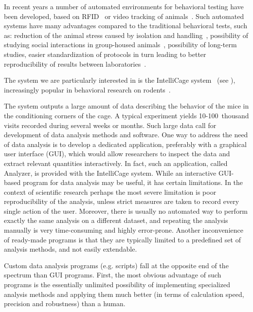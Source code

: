 
In recent years a number of automated environments for behavioral testing
have been developed, based on 
RFID~\cite{Dellomo:1998ts,Galsworthy:2005br,Daan:2011wl,EcoHABfullyauto:2015tk}
or video tracking of
animals~\cite{deChaumont:2012du,Weissbrod:2013bc,Shemesh:2013be,PerezEscudero:2014ed}.
Such automated systems have many advantages compared to the traditional behavioral tests,
such as:
reduction of the animal stress caused by isolation and
handling~\cite{Heinrichs:2006dk,Sorge:2014fb},
possibility of studying social interactions in group-housed
animals~\cite{Kiryk:2011tk},
possibility of long-term studies,
easier standardization of protocols in turn leading to better
reproducibility of results between
laboratories~\cite{Crabbe:1999vf,Chesler:2002wo,Krackow:2010ck,Codita:2012jv,Morrison:2014cn,Vannoni:2014jt}.

The system we are particularly interested in is the IntelliCage
system~\cite{intelliCagePlusManual2011,Kiryk:2011tk,Radwanska:2012fd,Puscian:2014cu,Mijakowska:2015io}
(see ), increasingly popular in behavioral research on
rodents~\cite{IntelliCageReferenceList}.

The system outputs a large amount of data
describing the behavior of the mice in the conditioning corners of the cage.
A typical experiment yields
10-100~thousand visits recorded during several weeks or months.
Such large data call for development of data analysis methods
and software. One way to address the need of data analysis is to develop a
dedicated application, preferably with a graphical user interface (GUI),
which would allow researchers to inspect the data and extract relevant quantities
interactively. In fact, such an application, called Analyzer, is
provided with the IntelliCage system. While an
interactive GUI-based program for data analysis may be
useful, it has certain limitations. In the context of scientific research
perhaps the most severe limitation is poor reproducibility of the analysis,
unless strict measures are taken to record
every single action of the user. Moreover, there is usually no automated
way to perform exactly the same analysis on a different dataset, 
and repeating the analysis manually is very time-consuming 
and highly error-prone. Another inconvenience of ready-made programs is
that they are typically limited to a predefined set of analysis methods,
and not easily extendable.

Custom data analysis programs (e.g. scripts) fall at the opposite end of the
spectrum than GUI programs. First, the most obvious advantage of such
programs is the essentially unlimited possibility of implementing specialized
analysis methods and applying them much better (in terms of calculation speed,
precision and robustness) than a human.

